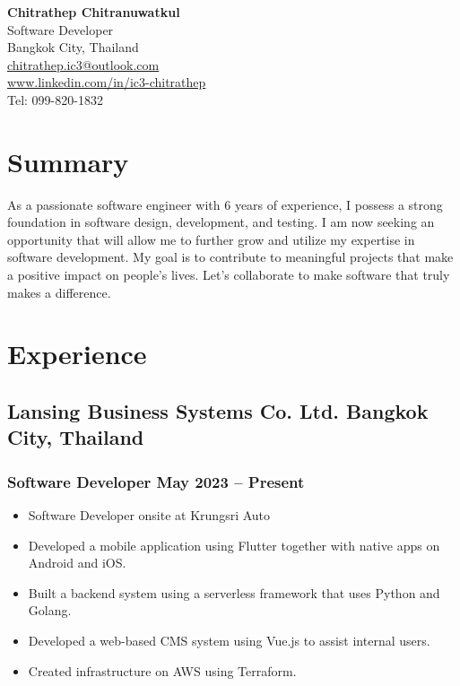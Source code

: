 \documentclass[a4paper,10pt]{article}
\begin{document}
\begin{center}
    {\LARGE \textbf{Chitrathep Chitranuwatkul}} \\
    Software Developer \\
    Bangkok City, Thailand \\
    \href{mailto:chitrathep.ic3@outlook.com}{chitrathep.ic3@outlook.com} \\
    \href{https://www.linkedin.com/in/ic3-chitrathep}{www.linkedin.com/in/ic3-chitrathep} \\
    Tel: 099-820-1832 \\
\end{center}

\vspace{1em}

\section*{Summary}
As a passionate software engineer with 6 years of experience, I possess a strong foundation in software design, development, and testing. I am now seeking an opportunity that will allow me to further grow and utilize my expertise in software development. My goal is to contribute to meaningful projects that make a positive impact on people's lives. Let's collaborate to make software that truly makes a difference.

\section*{Experience}

\subsection*{Lansing Business Systems Co. Ltd. \hfill Bangkok City, Thailand}
\subsubsection*{Software Developer \hfill May 2023 – Present}
\begin{itemize}[leftmargin=1.5em]
    \item Software Developer onsite at Krungsri Auto
    \item Developed a mobile application using Flutter together with native apps on Android and iOS.
    \item Built a backend system using a serverless framework that uses Python and Golang.
    \item Developed a web-based CMS system using Vue.js to assist internal users.
    \item Created infrastructure on AWS using Terraform.
\end{itemize}
\end{document}
